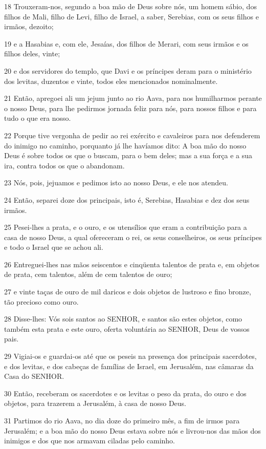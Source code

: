 \par 18 Trouxeram-nos, segundo a boa mão de Deus sobre nós, um homem sábio, dos filhos de Mali, filho de Levi, filho de Israel, a saber, Serebias, com os seus filhos e irmãos, dezoito;
\par 19 e a Hasabias e, com ele, Jesaías, dos filhos de Merari, com seus irmãos e os filhos deles, vinte;
\par 20 e dos servidores do templo, que Davi e os príncipes deram para o ministério dos levitas, duzentos e vinte, todos eles mencionados nominalmente.
\par 21 Então, apregoei ali um jejum junto ao rio Aava, para nos humilharmos perante o nosso Deus, para lhe pedirmos jornada feliz para nós, para nossos filhos e para tudo o que era nosso.
\par 22 Porque tive vergonha de pedir ao rei exército e cavaleiros para nos defenderem do inimigo no caminho, porquanto já lhe havíamos dito: A boa mão do nosso Deus é sobre todos os que o buscam, para o bem deles; mas a sua força e a sua ira, contra todos os que o abandonam.
\par 23 Nós, pois, jejuamos e pedimos isto ao nosso Deus, e ele nos atendeu.
\par 24 Então, separei doze dos principais, isto é, Serebias, Hasabias e dez dos seus irmãos.
\par 25 Pesei-lhes a prata, e o ouro, e os utensílios que eram a contribuição para a casa de nosso Deus, a qual ofereceram o rei, os seus conselheiros, os seus príncipes e todo o Israel que se achou ali.
\par 26 Entreguei-lhes nas mãos seiscentos e cinqüenta talentos de prata e, em objetos de prata, cem talentos, além de cem talentos de ouro;
\par 27 e vinte taças de ouro de mil daricos e dois objetos de lustroso e fino bronze, tão precioso como ouro.
\par 28 Disse-lhes: Vós sois santos ao SENHOR, e santos são estes objetos, como também esta prata e este ouro, oferta voluntária ao SENHOR, Deus de vossos pais.
\par 29 Vigiai-os e guardai-os até que os peseis na presença dos principais sacerdotes, e dos levitas, e dos cabeças de famílias de Israel, em Jerusalém, nas câmaras da Casa do SENHOR.
\par 30 Então, receberam os sacerdotes e os levitas o peso da prata, do ouro e dos objetos, para trazerem a Jerusalém, à casa de nosso Deus.
\par 31 Partimos do rio Aava, no dia doze do primeiro mês, a fim de irmos para Jerusalém; e a boa mão do nosso Deus estava sobre nós e livrou-nos das mãos dos inimigos e dos que nos armavam ciladas pelo caminho.
